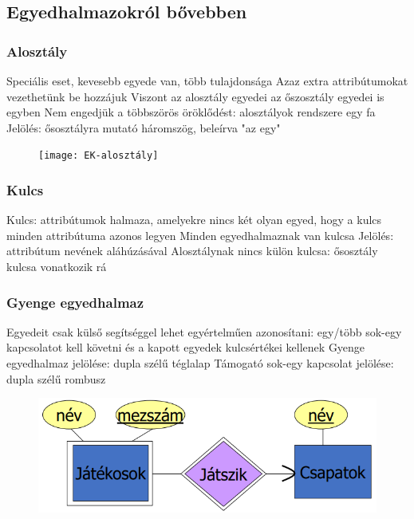 \documentclass[12pt,a4paper]{article}
\begin{document}
\pagebreak

\subsection{Egyedhalmazokról bővebben}

\subsubsection{Alosztály}

\begin{outline}
	\1 Speciális eset, kevesebb egyede van, több tulajdonsága
	\1 Azaz extra attribútumokat vezethetünk be hozzájuk
	\1 Viszont az alosztály egyedei az őszosztály egyedei is egyben
	\1 Nem engedjük a többszörös öröklődést: alosztályok rendszere egy fa
	\1 Jelölés: ősosztályra mutató háromszög, beleírva "az egy"
\end{outline}

\begin{figure}[h!]
	\centering
	\texttt{[image: EK-alosztály]}
\end{figure}

\subsubsection{Kulcs}

\begin{outline}
	\1 Kulcs: attribútumok halmaza, amelyekre nincs két olyan egyed, hogy a kulcs minden attribútuma azonos legyen
	\1 Minden egyedhalmaznak van kulcsa
	\1 Jelölés: attribútum nevének aláhúzásával
	\1 Alosztálynak nincs külön kulcsa: ősosztály kulcsa vonatkozik rá
\end{outline}

\subsubsection{Gyenge egyedhalmaz}

\begin{outline}
	\1 Egyedeit csak külső segítséggel lehet egyértelműen azonosítani: egy/több sok-egy kapcsolatot kell követni és a kapott egyedek kulcsértékei kellenek
	\1 Gyenge egyedhalmaz jelölése: dupla szélű téglalap
	\1 Támogató sok-egy kapcsolat jelölése: dupla szélű rombusz
\end{outline}

\begin{figure}[h!]
	\centering
	\includegraphics[width=0.3\linewidth]{EK-gyenge-egyedhalmaz}
\end{figure}
\end{document}
